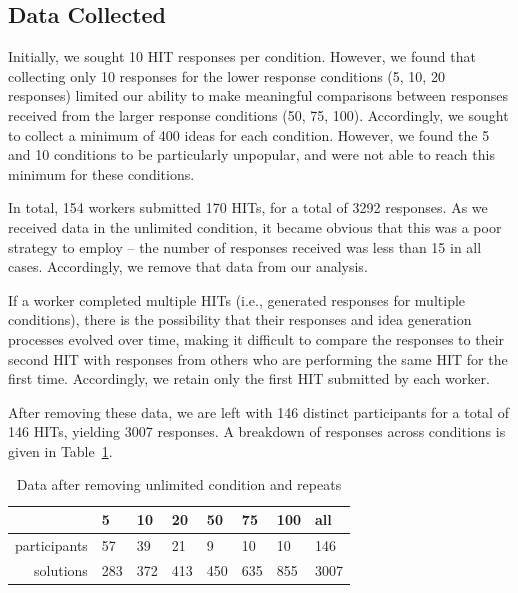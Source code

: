 \subsection{Data Collected}

Initially, we sought 10 HIT responses per condition. However, we found that collecting only 10 responses for the lower response conditions (5, 10, 20 responses) limited our ability to make meaningful comparisons between responses received from the larger response conditions (50, 75, 100). Accordingly, we sought to collect a minimum of 400 ideas for each condition. However, we found the 5 and 10 conditions to be particularly unpopular, and were not able to reach this minimum for these conditions.

In total, 154 workers submitted 170 HITs, for a total of 3292 responses. As we received data in the unlimited condition, it became obvious that this was a poor strategy to employ -- the number of responses received was less than 15 in all cases. Accordingly, we remove that data from our analysis.

If a worker completed multiple HITs (i.e., generated responses for multiple conditions), there is the possibility that their responses and idea generation processes evolved over time, making it difficult to compare the responses to their second HIT with responses from others who are performing the same HIT for the first time. Accordingly, we retain only the first HIT submitted by each worker.

After removing these data, we are left with 146 distinct participants for a total of 146 HITs, yielding 3007 responses. A breakdown of responses across conditions is given in Table~\ref{tab:data_collected}.

\begin{table}[h!]
\begin{tabular}{r | l l l l l l l }
    & 5 & 10 & 20 & 50 & 75 & 100 & all \\ \hline
    participants & 57 & 39 & 21 & 9 & 10 & 10 & 146 \\
    solutions & 283 & 372 & 413 & 450 & 635 & 855 & 3007
\end{tabular}
\caption{Data after removing unlimited condition and repeats}
\label{tab:data_collected}
\end{table}


